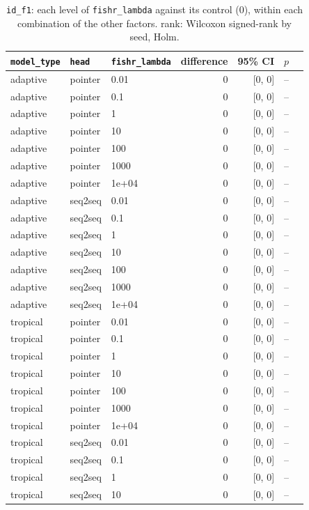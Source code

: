 \documentclass[10pt]{article}
\begin{document}
{\small
\begin{longtable}{lllrrrl}
\caption{\texttt{id\_f1}: each level of \texttt{fishr\_lambda} against its control (0), within each combination of the other factors. rank: Wilcoxon signed-rank by seed, Holm.}\label{tab:control-id_f1}\\
\toprule
\texttt{model\_type} & \texttt{head} & \texttt{fishr\_lambda} & difference & 95\% CI & $p$ & \\
\midrule
\endhead
adaptive & pointer & 0.01 & 0 & [0, 0] & -- & \\
adaptive & pointer & 0.1 & 0 & [0, 0] & -- & \\
adaptive & pointer & 1 & 0 & [0, 0] & -- & \\
adaptive & pointer & 10 & 0 & [0, 0] & -- & \\
adaptive & pointer & 100 & 0 & [0, 0] & -- & \\
adaptive & pointer & 1000 & 0 & [0, 0] & -- & \\
adaptive & pointer & 1e+04 & 0 & [0, 0] & -- & \\
adaptive & seq2seq & 0.01 & 0 & [0, 0] & -- & \\
adaptive & seq2seq & 0.1 & 0 & [0, 0] & -- & \\
adaptive & seq2seq & 1 & 0 & [0, 0] & -- & \\
adaptive & seq2seq & 10 & 0 & [0, 0] & -- & \\
adaptive & seq2seq & 100 & 0 & [0, 0] & -- & \\
adaptive & seq2seq & 1000 & 0 & [0, 0] & -- & \\
adaptive & seq2seq & 1e+04 & 0 & [0, 0] & -- & \\
tropical & pointer & 0.01 & 0 & [0, 0] & -- & \\
tropical & pointer & 0.1 & 0 & [0, 0] & -- & \\
tropical & pointer & 1 & 0 & [0, 0] & -- & \\
tropical & pointer & 10 & 0 & [0, 0] & -- & \\
tropical & pointer & 100 & 0 & [0, 0] & -- & \\
tropical & pointer & 1000 & 0 & [0, 0] & -- & \\
tropical & pointer & 1e+04 & 0 & [0, 0] & -- & \\
tropical & seq2seq & 0.01 & 0 & [0, 0] & -- & \\
tropical & seq2seq & 0.1 & 0 & [0, 0] & -- & \\
tropical & seq2seq & 1 & 0 & [0, 0] & -- & \\
tropical & seq2seq & 10 & 0 & [0, 0] & -- & \\

\end{longtable}}
\end{document}
